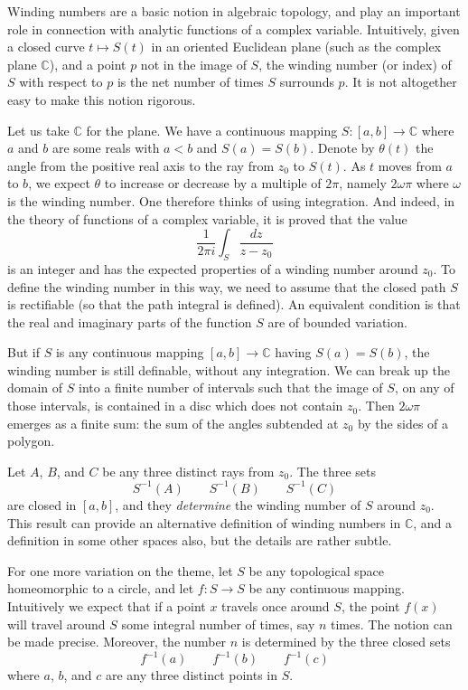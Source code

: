\documentclass[12pt]{article}
\begin{document}
Winding numbers are a basic notion in algebraic topology, and play an
important role in connection with analytic functions of a complex variable.
Intuitively, given a closed curve $t\mapsto S(t)$ in an oriented
Euclidean plane (such as the complex plane $\mathbb{C}$), and a point
$p$ not in the image of $S$, the winding number (or index) of $S$ with respect
to $p$ is the net number of times $S$ surrounds $p$. It is not altogether
easy to make this notion rigorous.

Let us take $\mathbb{C}$ for the plane. We have
a continuous mapping $S:[a,b]\to \mathbb{C}$ where $a$ and $b$ are some
reals with $a<b$ and $S(a)=S(b)$. Denote by $\theta(t)$ the angle from the
positive real axis to the ray from $z_0$ to $S(t)$. As $t$ moves from $a$ to
$b$, we expect $\theta$ to increase or decrease by a multiple of $2\pi$,
namely $2\omega\pi$ where $\omega$ is the winding number. One therefore thinks
of using integration. And indeed, in the theory of
functions of a complex variable, it is proved that the value
$$\frac{1}{2\pi i} \int_S \frac{dz}{z-z_0}$$
is an integer and has the expected properties of a winding number around
$z_0$. To define the winding number in this way, we need to assume
that the closed path $S$ is rectifiable (so that the path
integral is defined). An equivalent condition is that the real and imaginary
parts of the function $S$ are of bounded variation.

But if $S$ is any continuous mapping $[a,b]\to \mathbb{C}$ having
$S(a)=S(b)$, the winding number is still definable, without any integration.
We can break up the domain of $S$ into a finite number of intervals such that
the image of $S$, on any of those intervals, is contained in a disc which
does not contain $z_0$. Then $2\omega\pi$ emerges as a finite sum: the sum
of the angles subtended at $z_0$ by the sides of a polygon.

Let $A$, $B$, and $C$ be any three distinct rays from $z_0$.
The three sets
$$S^{-1}(A)\qquad S^{-1}(B)\qquad S^{-1}(C)$$
are closed in $[a,b]$, and they \emph{determine}
the winding number of $S$ around $z_0$. This result can provide an alternative
definition of winding numbers in $\mathbb{C}$, and a definition in some other
spaces also, but the details are rather subtle.

For one more variation on the theme, let $S$ be any topological space
homeomorphic to a circle, and let
$f:S\to S$ be any continuous mapping. Intuitively we expect that if a point
$x$ travels once around $S$, the point $f(x)$ will travel around $S$ some
integral number of times, say $n$ times. The notion can be made precise.
Moreover, the number $n$ is determined by the three closed sets
$$f^{-1}(a)\qquad f^{-1}(b)\qquad f^{-1}(c)$$
where $a$, $b$, and $c$ are any three distinct points in $S$.
\end{document}
